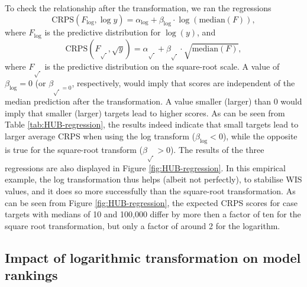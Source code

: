 \documentclass{article}
\begin{document}
To check the relationship after the transformation, we ran the regressions
\begin{equation*}
    \text{CRPS}(F_{\log}, \log y) = \alpha_{\log} + \beta_{\log} \cdot \log{(\text{median}(F))},
\end{equation*}
where $F_{\log}$ is the predictive distribution for $\log(y)$, and
\begin{equation*}
    \text{CRPS}(F_{\sqrt{\ }}, \sqrt{y}) = \alpha_{\sqrt{\ }} + \beta_{\sqrt{\ }} \cdot \sqrt{\text{median}(F)},
\end{equation*} 
where $F_{\sqrt{\ }}$ is the predictive distribution on the square-root scale. A value of $\beta_{\log} = 0$ (or $\beta_{\sqrt{\ } = 0}$, respectively, would imply that scores are independent of the median prediction after the transformation. A value smaller (larger) than 0 would imply that smaller (larger) targets lead to higher scores. As can be seen from Table \ref{tab:HUB-regression}, the results indeed indicate that small targets lead to larger average CRPS when using the log transform ($\beta_{\log} < 0$), while the opposite is true for the square-root transform ($\beta_{\sqrt{\ }} > 0$). The results of the three regressions are also displayed in Figure \ref{fig:HUB-regression}. In this empirical example, the log transformation thus helps (albeit not perfectly), to stabilise WIS values, and it does so more successfully than the square-root transformation. As can be seen from Figure \ref{fig:HUB-regression}, the expected CRPS scores for case targets with medians of 10 and 100,000 differ by more then a factor of ten for the square root transformation, but only a factor of around 2 for the logarithm.

\subsection{Impact of logarithmic transformation on model rankings}
\end{document}
